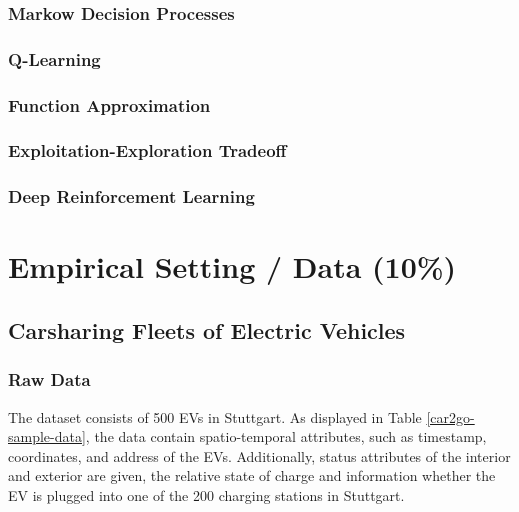 \documentclass[12pt, article]{article}
\begin{document}
\subsubsection{Markow Decision Processes}
\label{sec:orgae899cb}
\subsubsection{Q-Learning}
\label{sec:orgabfeb8c}
\subsubsection{Function Approximation}
\label{sec:org5d53aa5}
\subsubsection{Exploitation-Exploration Tradeoff}
\label{sec:orgdf4b9b2}
\subsubsection{Deep Reinforcement Learning}
\label{sec:org31031bb}
\section{Empirical Setting / Data (10\%)}
\label{sec:org32cd6dc}
\subsection{Carsharing Fleets of Electric Vehicles}
\label{sec:orge4c100d}
\subsubsection{Raw Data}
\label{sec:org67a96be}
The dataset consists of 500 EVs in Stuttgart. As displayed in Table
\ref{car2go-sample-data}, the data contain spatio-temporal attributes, such as
timestamp, coordinates, and address of the EVs. Additionally, status attributes
of the interior and exterior are given, the relative state of charge and
information whether the EV is plugged into one of the 200 charging stations in
Stuttgart.
\end{document}
